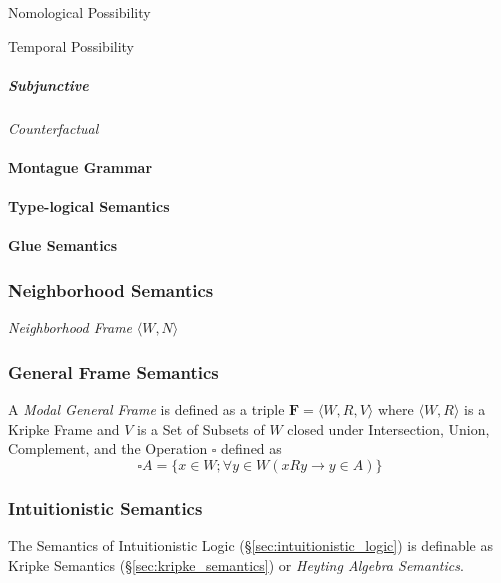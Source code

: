 Nomological Possibility

Temporal Possibility

\subparagraph{Subjunctive}\label{sec:subjunctive}\hfill

\emph{Counterfactual}



\paragraph{Montague Grammar}\label{sec:montague_grammar}\hfill

\paragraph{Type-logical Semantics}\label{sec:typelogical_semantics}\hfill

\paragraph{Glue Semantics}\label{sec:glue_semantics}\hfill



\subsubsection{Neighborhood Semantics}
\label{sec:neighborhood_semantics}

\emph{Neighborhood Frame} $\langle W, N \rangle$



\subsubsection{General Frame Semantics}
\label{sec:general_frame_semantics}

A \emph{Modal General Frame} is defined as a triple $\mathbf{F} =
\langle W,R,V \rangle$ where $\langle W,R \rangle$ is a Kripke Frame
and $V$ is a Set of Subsets of $W$ closed under Intersection, Union,
Complement, and the Operation $\square$ defined as
\[
    \square A = \{x \in W; \forall y \in W ( x R y \rightarrow y \in A ) \}
\]



\subsubsection{Intuitionistic Semantics}
\label{sec:intuitionistic_semantics}

The Semantics of Intuitionistic Logic
(\S\ref{sec:intuitionistic_logic}) is definable as Kripke Semantics
(\S\ref{sec:kripke_semantics}) or \emph{Heyting Algebra Semantics}.



